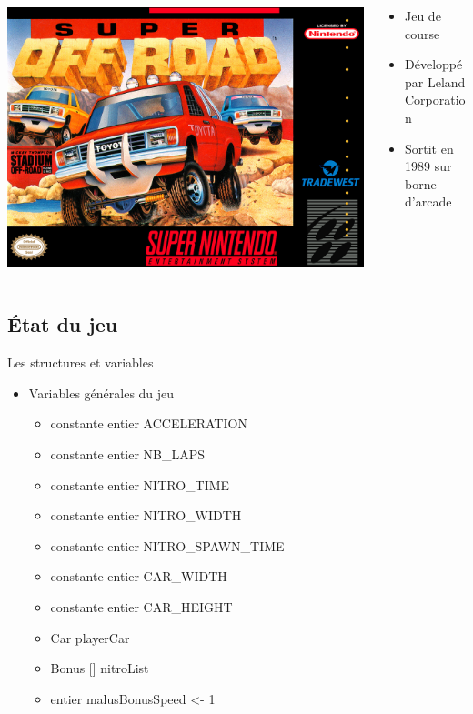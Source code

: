 \documentclass[10pt,dvipsnames,final]{beamer}
\newcommand{\midcolumn}[2]{
\begin{columns}
	\begin{column}{0.5\textwidth}
		#1
	\end{column}
	\begin{column}{0.5\textwidth}
		#2
	\end{column}
\end{columns}
}
\begin{document}
\begin{frame}
\midcolumn{\includegraphics[width=\textwidth]{presentationfiles/super_off_road_us_box_art}}{
\begin{itemize}
	\item Jeu de course
	\item Développé par Leland Corporation
	\item Sortit en 1989 sur borne d'arcade
\end{itemize}
}
\end{frame}

\subsection{État du jeu}

\begin{frame}{Les structures et variables}
\begin{itemize}
\item Variables générales du jeu
\begin{itemize}
\item constante entier ACCELERATION
\item constante entier NB\_LAPS
\item constante entier NITRO\_TIME
\item constante entier NITRO\_WIDTH
\item constante entier NITRO\_SPAWN\_TIME
\item constante entier CAR\_WIDTH
\item constante entier CAR\_HEIGHT
\item Car playerCar
\item Bonus [] nitroList
\item entier malusBonusSpeed <- 1
\end{itemize}
\end{itemize}
\end{frame}
\end{document}
